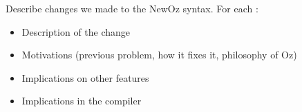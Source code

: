 
Describe changes we made to the NewOz syntax.
For each :
\begin{itemize}
    \item Description of the change
    \item Motivations (previous problem, how it fixes it, philosophy of Oz)
    \item Implications on other features
    \item Implications in the compiler
\end{itemize}